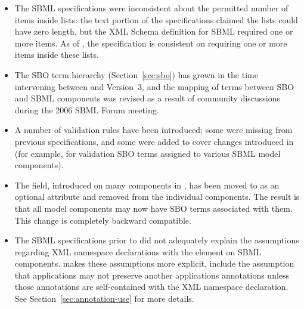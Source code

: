\begin{blockChanged}
\begin{itemize}
\item The SBML specifications were inconsistent about the
  permitted number of items inside
   lists: the text portion of the
  specifications claimed the lists could have zero length, but the
  XML Schema definition for SBML required one or more items.  As
  of \sbmltwothree, the specification is consistent on requiring
  one or more items inside these lists.

\item The SBO term hierarchy (Section~\ref{sec:sbo}) has grown in
  the time intervening between \sbmltwotwo and Version~3, and the
  mapping of terms between SBO and SBML components was revised as
  a result of community discussions during the 2006 SBML Forum
  meeting.

\item A number of validation rules have been introduced; some were
  missing from previous specifications, and some were added to
  cover  changes introduced in \sbmltwothree (for example, for
  validation SBO terms assigned to various SBML model components).

\item The  field, introduced on many components in
  \sbmltwotwo, has been moved to \SBase as an optional attribute
  and removed from the individual components.  The result is that
  all model components may now have SBO terms associated with
  them.  This change is completely backward compatible.

\item The SBML specifications prior to \sbmltwothree did not
  adequately explain the assumptions regarding XML namespace
  declarations with the  element on SBML
  components.  \sbmltwothree makes these assumptions more
  explicit, include the assumption that applications may not
  preserve another applications annotations unless those
  annotations are self-contained with the XML namespace
  declaration.  See Section~\ref{sec:annotation-use} for more
  details.


\end{itemize}








\end{blockChanged}
